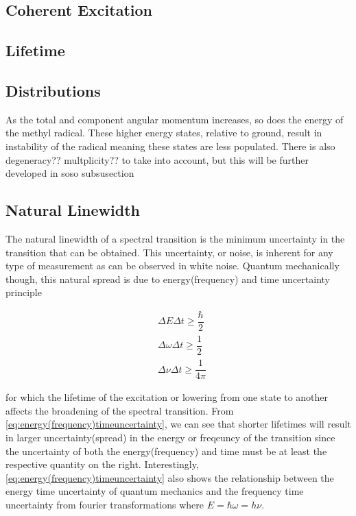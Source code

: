 \documentclass[11pt,a4paper]{book}
\begin{document}
\subsection{Coherent Excitation}
\subsection{Lifetime}
\subsection{Distributions}
\label{subsec:Distributions}
As the total and component angular momentum increases, so does the energy of the methyl radical. These higher energy states, relative to ground, result in instability of the radical meaning these states are less populated. There is also degeneracy?? multplicity?? to take into account, but this will be further developed in soso subsusection \todo{}\
\subsection{Natural Linewidth}
\label{subsec:Natural Linewidth}
The natural linewidth of a spectral transition is the minimum uncertainty in the transition that can be obtained. This uncertainty, or noise, is inherent for any type of measurement as can be observed in white noise. Quantum mechanically though, this natural spread is due to energy(frequency) and time uncertainty principle

\begin{equation}
\label{eq:energy(frequency)timeuncertainty}
\begin{split}
&\Delta E \Delta t \geq \dfrac{\hbar}{2} \\
&\Delta \omega \Delta t \geq \dfrac{1}{2} \\
&\Delta \nu \Delta t \geq \dfrac{1}{4 \pi}
\end{split}
\end{equation}

\noindent
for which the lifetime of the excitation or lowering from one state to another affects the broadening of the spectral transition. From \autoref{eq:energy(frequency)timeuncertainty}, we can see that shorter lifetimes will result in larger uncertainty(spread) in the energy or freqeuncy of the transition since the uncertainty of both the energy(frequency) and time must be at least the respective quantity on the right. Interestingly, \autoref{eq:energy(frequency)timeuncertainty} also shows the relationship between the energy time uncertainty of quantum mechanics and the frequency time uncertainty from fourier transformations where $E=\hbar \omega =h \nu$. 
\end{document}
